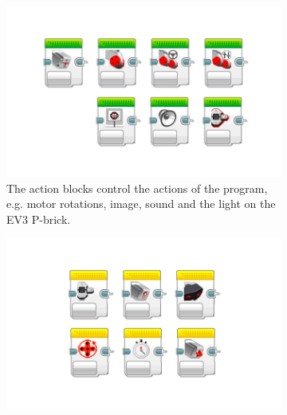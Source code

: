 \documentclass[runningheads,a4paper]{llncs}
\begin{document}
  \begin{figure}[H]
\centering
\begin{subfigure}[t]{0.45\textwidth}\centering\includegraphics[width=.9\columnwidth]{images/LearnToProgram_action_blocks_landscape.png}
\caption{The action blocks control the actions of the program, e.g. motor rotations, image, sound and the light on the EV3 P-brick.}\label{fig:actionblocks}\end{subfigure}\hspace*{\fill}
\begin{subfigure}[t]{0.45\textwidth}\centering\includegraphics[width=.9\columnwidth]{images/LearnToProgram_sensor_blocks_landscape.png}

\end{subfigure}
\end{figure}
\end{document}
